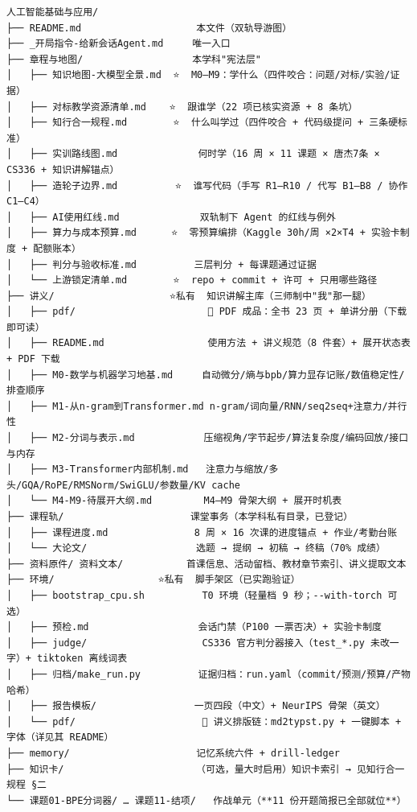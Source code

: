 \documentclass[
  chinese,
  11pt,
]{ctexart}
\begin{document}
\begin{verbatim}
人工智能基础与应用/
├── README.md                    本文件（双轨导游图）
├── _开局指令-给新会话Agent.md     唯一入口
├── 章程与地图/                   本学科"宪法层"
│   ├── 知识地图-大模型全景.md  ⭐  M0–M9：学什么（四件咬合：问题/对标/实验/证据）
│   ├── 对标教学资源清单.md    ⭐  跟谁学（22 项已核实资源 + 8 条坑）
│   ├── 知行合一规程.md        ⭐  什么叫学过（四件咬合 + 代码级提问 + 三条硬标准）
│   ├── 实训路线图.md              何时学（16 周 × 11 课题 × 唐杰7条 × CS336 + 知识讲解锚点）
│   ├── 造轮子边界.md          ⭐  谁写代码（手写 R1–R10 / 代写 B1–B8 / 协作 C1–C4）
│   ├── AI使用红线.md              双轨制下 Agent 的红线与例外
│   ├── 算力与成本预算.md      ⭐  零预算编排（Kaggle 30h/周 ×2×T4 + 实验卡制度 + 配额账本）
│   ├── 判分与验收标准.md          三层判分 + 每课题通过证据
│   └── 上游锁定清单.md        ⭐  repo + commit + 许可 + 只用哪些路径
├── 讲义/                    ⭐私有  知识讲解主库（三师制中"我"那一腿）
│   ├── pdf/                       📕 PDF 成品：全书 23 页 + 单讲分册（下载即可读）
│   ├── README.md                  使用方法 + 讲义规范（8 件套）+ 展开状态表 + PDF 下载
│   ├── M0-数学与机器学习地基.md     自动微分/熵与bpb/算力显存记账/数值稳定性/排查顺序
│   ├── M1-从n-gram到Transformer.md n-gram/词向量/RNN/seq2seq+注意力/并行性
│   ├── M2-分词与表示.md            压缩视角/字节起步/算法复杂度/编码回放/接口与内存
│   ├── M3-Transformer内部机制.md   注意力与缩放/多头/GQA/RoPE/RMSNorm/SwiGLU/参数量/KV cache
│   └── M4-M9-待展开大纲.md         M4–M9 骨架大纲 + 展开时机表
├── 课程轨/                      课堂事务（本学科私有目录，已登记）
│   ├── 课程进度.md               8 周 × 16 次课的进度锚点 + 作业/考勤台账
│   └── 大论文/                   选题 → 提纲 → 初稿 → 终稿（70% 成绩）
├── 资料原件/ 资料文本/           首课信息、活动留档、教材章节索引、讲义提取文本
├── 环境/                  ⭐私有  脚手架区（已实跑验证）
│   ├── bootstrap_cpu.sh          T0 环境（轻量档 9 秒；--with-torch 可选）
│   ├── 预检.md                   会话门禁（P100 一票否决）+ 实验卡制度
│   ├── judge/                    CS336 官方判分器接入（test_*.py 未改一字）+ tiktoken 离线词表
│   ├── 归档/make_run.py          证据归档：run.yaml（commit/预测/预算/产物哈希）
│   ├── 报告模板/                 一页四段（中文）+ NeurIPS 骨架（英文）
│   └── pdf/                      📕 讲义排版链：md2typst.py + 一键脚本 + 字体（详见其 README）
├── memory/                      记忆系统六件 + drill-ledger
├── 知识卡/                       （可选，量大时启用）知识卡索引 → 见知行合一规程 §二
└── 课题01-BPE分词器/ … 课题11-结项/   作战单元（**11 份开题简报已全部就位**）
\end{verbatim}
\end{document}

